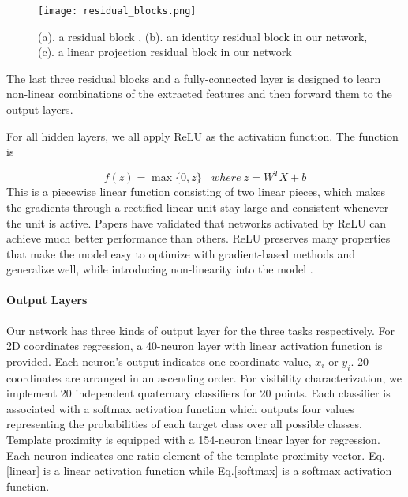\begin{figure}[h]		
	\texttt{[image: residual\_blocks.png]}
	\caption{(a). a residual block \cite{DBLP:journals/corr/HeZRS15}, (b). an identity residual block in our network, (c). a linear projection residual block in our network}
	\centering
	\label{figure:residual_blocks}
\end{figure}

The last three residual blocks and a fully-connected layer is designed to learn non-linear combinations of the extracted features and then forward them to the output layers.

For all hidden layers, we all apply ReLU as the activation function. The function is

\begin{equation}
\label{relu}
f(z) = \max \{0, z\} ~~~~where~ z = W^TX+b
\end{equation}
This is a piecewise linear function consisting of two linear pieces, which makes the gradients through a rectified linear unit stay large and consistent whenever the unit is active. Papers \cite{pmlr-v15-glorot11a, Nair:2010:RLU:3104322.3104425, DBLP:journals/corr/JarrettKGL16} have validated that networks activated by ReLU can achieve much better performance than others. ReLU preserves many properties that make the model easy to optimize with gradient-based methods and generalize well, while introducing non-linearity into the model \cite{Goodfellow-et-al-2016}. 

\paragraph{Output Layers}
\label{output}

Our network has three kinds of output layer for the three tasks respectively. For 2D coordinates regression, a 40-neuron layer with linear activation function is provided.  Each neuron's output indicates one coordinate value, \ie $x_i$ or $y_i$.  20 coordinates are arranged in an ascending order. For visibility characterization, we implement 20 independent quaternary classifiers for 20 points. Each classifier is associated with a softmax activation function \cite{Bishop:2006:PRM:1162264} which outputs four values representing the probabilities of each target class over all possible classes. Template proximity is equipped with a 154-neuron linear layer for regression.  Each neuron indicates one ratio element of the template proximity vector. Eq.\ref{linear} is a linear activation function while Eq.\ref{softmax} is a softmax activation function.

